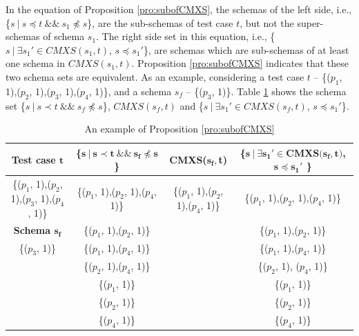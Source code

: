 In the equation of Proposition \ref{pro:subofCMXS}, the schemas of the left side, i.e., \{$s\ |\ s \preceq t\ \&\&\ s_{1} \npreceq s$\}, are the sub-schemas of test case $t$, but not the super-schemas of  schema $s_{1}$.  The right side set in this equation, i.e., \{$ s\ |\ \exists s_{1}' \in CMXS(s_{1}, t)$, $s \preceq s_{1}'$\}, are schemas which are sub-schemas of at least one schema in $CMXS(s_{1}, t)$. Proposition \ref{pro:subofCMXS} indicates that these two schema sets are equivalent. As an example, considering a test case $t$ -- \{($p_{1}$, 1),($p_{2}$, 1),($p_{3}$, 1),($p_{4}$, 1)\}, and a schema $s_{f}$ --  \{($p_{3}$, 1)\}. Table \ref{examleOfCMXSPro} shows the schema set  \{$s\ |\ s \prec t\ \&\&\ s_{f} \npreceq s$\}, $CMXS(s_{f}, t)$ and \{$ s\ |\ \exists s_{1}' \in CMXS(s_{f}, t)$, $s \preceq s_{1}'$\}.

\begin{table}[ht]
  \centering
  \setlength{\tabcolsep}{2pt}
  \caption{An example of Proposition \ref{pro:subofCMXS}}
  {\footnotesize
    \begin{tabular}{|c|c|c|c|}
    \hline
  \textbf{  Test case $\textbf{t}$} & \textbf{ \{$\textbf{s}\ |\ \textbf{s} \prec \textbf{t}\ \&\&\ \textbf{s}_{\textbf{f}} \npreceq \textbf{s}$\} }& \textbf{ CMXS($\textbf{s}_{\textbf{f}}, $\textbf{t}$ $)} & \textbf{\{$ \textbf{s}\ |\ \exists \textbf{s}_{\textbf{1}}' \in \textbf{CMXS}\textbf{(}\textbf{s}_{\textbf{f}}, \textbf{t}\textbf{)}$, $\textbf{s} \preceq \textbf{s}_{\textbf{1}}'$ \}}\\\hline
    \{($p_{1}$, 1),($p_{2}$, 1),($p_{3}$, 1),($p_{4}$, 1)\}  & \{($p_{1}$, 1),($p_{2}$, 1),($p_{4}$, 1)\} & \{($p_{1}$, 1),($p_{2}$, 1),($p_{4}$, 1)\} & \{($p_{1}$, 1),($p_{2}$, 1),($p_{4}$, 1)\}\\ \cline{1-1}
      \textbf{Schema $\textbf{s}_{\textbf{f}}$}  & \{($p_{1}$, 1),($p_{2}$, 1)\} &  & \{($p_{1}$, 1),($p_{2}$, 1)\} \\\cline{1-1}
     \{($p_{3}$, 1)\}         & \{($p_{1}$, 1),($p_{4}$, 1)\}&  &\{($p_{1}$, 1),($p_{4}$, 1)\}\\
          &       \{($p_{2}$, 1),($p_{4}$, 1)\} &  &\{($p_{2}$, 1), ($p_{4}$, 1)\}\\
          &       \{($p_{1}$, 1)\} &  &\{($p_{1}$, 1)\}\\
          &       \{($p_{2}$, 1)\} &  &\{($p_{2}$, 1)\}\\
          &       \{($p_{4}$, 1)\} &  & \{($p_{4}$, 1)\}\\\hline
    \end{tabular}}%
  \label{examleOfCMXSPro}%
\end{table}%

